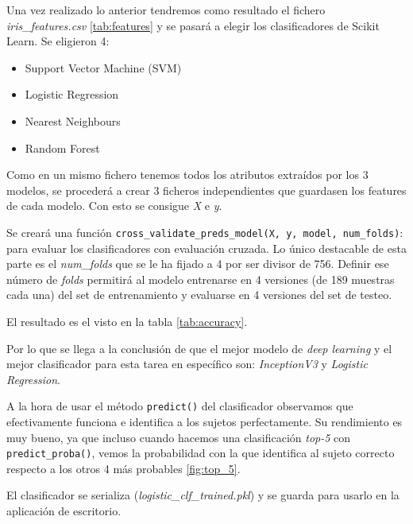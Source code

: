 Una vez realizado lo anterior tendremos como resultado el fichero \emph{iris\_features.csv} \ref{tab:features} y se pasará a elegir los clasificadores de Scikit Learn.
 Se eligieron 4:
 \begin{itemize}
     \item Support Vector Machine (SVM)
     \item Logistic Regression
     \item Nearest Neighbours
     \item Random Forest
 \end{itemize}
 
Como en un mismo fichero tenemos todos los atributos extraídos por los 3 modelos, se procederá a crear 3 ficheros independientes que guardasen los features de cada modelo. Con esto se consigue \emph{X} e \emph{y}.

 
 Se creará una función \texttt{cross\_validate\_preds\_model(X, y, model, num\_folds)}: para evaluar los clasificadores con evaluación cruzada. Lo único destacable de esta parte es el \emph{num\_folds} que se le ha fijado a 4 por ser divisor de 756. Definir ese número de \emph{folds} permitirá al modelo entrenarse en 4 versiones (de 189 muestras cada una) del set de entrenamiento y evaluarse en 4 versiones del set de testeo.
 
 El resultado es el visto en la tabla \ref{tab:accuracy}.
 
 Por lo que se llega a la conclusión de que el mejor modelo de \emph{deep learning} y el mejor clasificador para esta tarea en específico son: \emph{InceptionV3} y \emph{Logistic Regression}.
 
 A la hora de usar el método \texttt{predict()} del clasificador observamos que efectivamente funciona e identifica a los sujetos perfectamente.
 Su rendimiento es muy bueno, ya que incluso cuando hacemos una clasificación \emph{top-5} con \texttt{predict\_proba()}, vemos la probabilidad con la que identifica al sujeto correcto respecto a los otros 4 más probables \ref{fig:top_5}.
 
 El clasificador se serializa (\emph{logistic\_clf\_trained.pkl}) y se guarda para usarlo en la aplicación de escritorio.